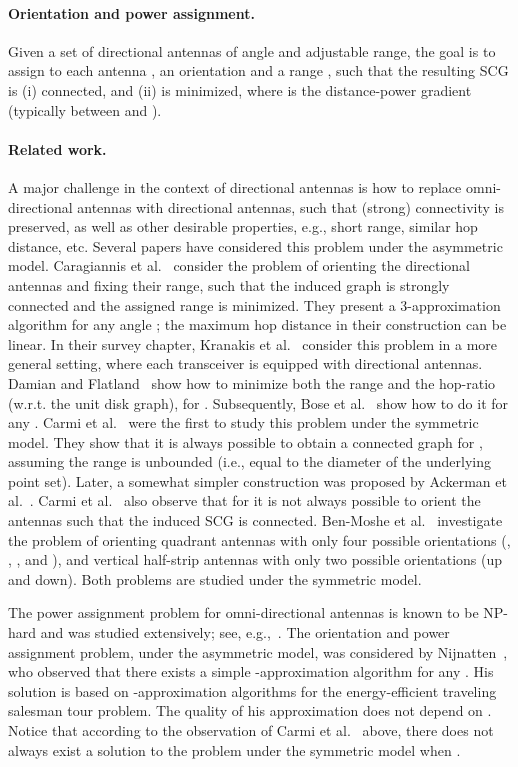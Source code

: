 \documentclass[11pt,letter]{article}
\begin{document}
\vspace{-2mm}
\paragraph{Orientation and power assignment.}
Given a set  of directional antennas of angle  and adjustable range, the goal is to assign to each antenna , an orientation and a range , such that the resulting SCG is (i) connected, and (ii)  is minimized, where  is the distance-power gradient (typically between  and ).

\paragraph{Related work.}
A major challenge in the context of directional antennas is how to replace omni-directional antennas with directional antennas, such that (strong) connectivity is preserved, as well as other desirable properties, e.g., short range, similar hop distance, etc.
Several papers have considered this problem under the asymmetric model.
Caragiannis et al.~\cite{CKK+08} consider the problem of orienting the directional antennas and fixing their range, such that the induced graph is strongly connected and the assigned range is minimized.
They present a 3-approximation algorithm for any angle ; the maximum hop distance in their construction can be linear.
In their survey chapter, Kranakis et al.~\cite{KKM} consider this problem in a more general setting, where each transceiver is equipped with  directional antennas.
Damian and Flatland~\cite{DF10} show how to minimize both the range and the hop-ratio (w.r.t. the unit disk graph), for . Subsequently, Bose et al.~\cite{BCDFKM11} show how to do it for any .
Carmi et al.~\cite{CKLR09} were the first to study this problem under the symmetric model. They show that it is always possible to obtain a connected graph for , assuming the range is unbounded (i.e., equal to the diameter of the underlying point set). Later, a somewhat simpler construction was proposed by Ackerman et al.~\cite{AGP10}.
Carmi et al.~\cite{CKLR09} also observe that for  it is not always possible to orient the antennas such that the induced SCG is connected.
Ben-Moshe et al.~\cite{bcckms-dawn-10} investigate the problem of orienting quadrant antennas with only four possible orientations (, , , and ), and vertical half-strip antennas with only two possible orientations (up and down). Both problems are studied under the symmetric model.

The power assignment problem for omni-directional antennas is known to be NP-hard and was studied extensively; see, e.g.,~\cite{KKKP00,CPS99,CMZ02,C10}.
The orientation and power assignment problem, under the asymmetric model, was considered by Nijnatten~\cite{N08}, who observed that there exists a simple -approximation algorithm for any . His solution is based on -approximation algorithms for the energy-efficient traveling salesman tour problem. The quality of his approximation does not depend on . Notice that according to the observation of Carmi et al.~\cite{CKLR09} above, there does not always exist a solution to the problem under the symmetric model when .
\end{document}
